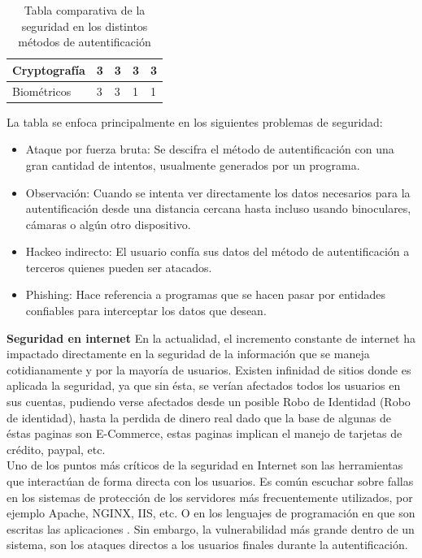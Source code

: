 \documentclass[12pt, a4paper, titlepage]{report}
\begin{document}
\begin{table}[H]
{\begin{tabular}{l|l|l|l|l|}
					\multicolumn{1}{|l|}{Cryptografía}                                                     & 3                                                                 & 3           & 3                                                          & 3        \\ \hline
					\multicolumn{1}{|l|}{Biométricos}                                                      & 3                                                                 & 3           & 1                                                          & 1        \\ \hline
				\end{tabular}
			}
			\caption[Seguridad en los métodos de autentificación]{Tabla comparativa de la seguridad en los distintos métodos de autentificaci\'on}
		\end{table}
		La tabla se enfoca principalmente en los siguientes problemas de seguridad: 
		
		\begin{itemize}
			\item Ataque por fuerza bruta: Se descifra el método de autentificaci\'on con una gran cantidad de intentos, usualmente generados por un programa.
			\item Observación: Cuando se intenta ver directamente los datos necesarios para la autentificaci\'on desde una distancia cercana hasta incluso usando binoculares, cámaras o algún otro dispositivo.
			\item Hackeo indirecto: El usuario confía sus datos del método de autentificaci\'on a terceros quienes pueden ser atacados. 
			\item Phishing: Hace referencia a programas que se hacen pasar por entidades confiables para interceptar los datos que desean.
		\end{itemize}
		
	    \textbf{Seguridad en internet}
	    En la actualidad, el incremento constante de internet ha impactado directamente en la seguridad de la información que se maneja cotidianamente y por la mayoría de usuarios. Existen infinidad de sitios donde es aplicada la seguridad, ya que sin ésta, se verían afectados todos los usuarios en  sus cuentas, pudiendo verse afectados desde un posible \Gls{Robo de Identidad} (Robo de identidad), hasta la perdida de dinero real dado que la base de algunas de éstas paginas son E-Commerce, estas paginas implican el manejo de tarjetas de crédito, paypal, etc.\\
		
		Uno de los puntos más críticos de la seguridad en Internet son las herramientas que interactúan de forma directa con los usuarios. Es común escuchar sobre fallas en los sistemas de protección de los servidores más frecuentemente utilizados, por ejemplo Apache, NGINX, IIS, etc. O en los lenguajes de programación en que son escritas las aplicaciones \cite{refSeguridadWeb}. Sin embargo, la vulnerabilidad más grande dentro de un sistema, son los ataques directos a los usuarios finales durante la autentificación.\\
	    
\end{document}
